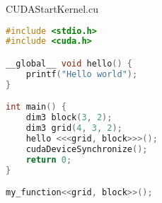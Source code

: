 \begin{codeblock}{CUDAStartKernel.cu}
    \begin{lstlisting}[language = C]
#include <stdio.h>
#include <cuda.h>

__global__ void hello() {
    printf("Hello world");
}

int main() {
    dim3 block(3, 2);
    dim3 grid(4, 3, 2);
    hello <<<grid, block>>>();
    cudaDeviceSynchronize();
    return 0;
}

my_function<<grid, block>>();\end{lstlisting}
\end{codeblock}